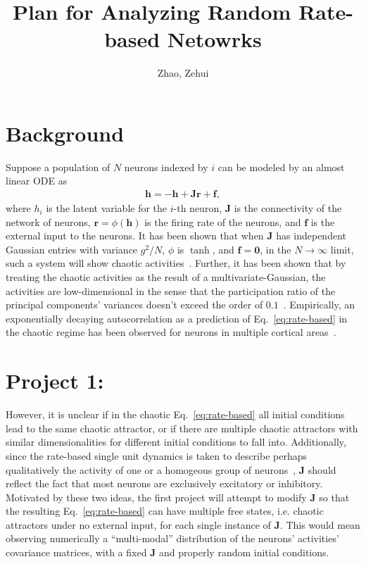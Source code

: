 \documentclass[11pt,openany,oneside]{article} %
\title{\vspace{-2em}Plan for Analyzing Random Rate-based Netowrks}
\author{Zhao, Zehui}
\date{}
\newcommand{\bd}[1]{\boldsymbol{#1}}%
\begin{document}
\maketitle

\section{Background}
Suppose a population of $N$ neurons indexed by $i$ can be modeled by an
almost linear ODE as
\begin{align}
  \label{eq:rate-based}
  \bd{h} = -\bd{h}+\bd{J}\bd{r}+\bd{f},
\end{align}
where $h_i$ is the latent variable for the $i$-th neuron, $\bd{J}$ is the connectivity of the
network of neurons, $\bd{r} = \phi(\bd{h})$ is the firing rate of the neurons, and $\bd{f}$ is the
external input to the neurons.  It has been shown that when $\bd{J}$ has independent Gaussian
entries with variance $g^2/N$, $\phi$ is $\tanh$, and $\bd{f} =\bd{0}$, in the $N\to\infty$ limit,
such a system will show chaotic activities~\cite{sompolinsky1988Chaos}.  Further, it has been shown
that by treating the chaotic activities as the result of a multivariate-Gaussian, the activities are
low-dimensional in the sense that the participation ratio of the principal components' variances
doesn't exceed the order of $0.1$~\cite{clark2022Dimension}.  Empirically, an exponentially decaying autocorrelation
as a prediction of Eq.~\ref{eq:rate-based} in the chaotic regime has been observed for neurons in
multiple cortical areas~\cite{murray2014Hierarchy}.

\section{Project 1:}
However, it is unclear if in the chaotic Eq.~\ref{eq:rate-based} all initial conditions lead to the
same chaotic attractor, or if there are multiple chaotic attractors with similar dimensionalities
for different initial conditions to fall into.  Additionally, since the rate-based single unit
dynamics is taken to describe perhaps qualitatively the activity of one or a homogeous
group of neurons~\cite{dayan2005Theoretical, ocker2022Dynamics}, $\bd{J}$ should reflect the fact that most neurons are exclusively
excitatory or inhibitory.  Motivated by these two ideas, the first project will attempt to modify
$\bd{J}$ so that the resulting Eq.~\ref{eq:rate-based} can have multiple free states, i.e. chaotic
attractors under no external input, for each single instance of $\bd{J}$.  This would mean observing
numerically a ``multi-modal'' distribution of the neurons' activities' covariance matrices, with a
fixed $\bd{J}$ and properly random initial conditions.
\end{document}
